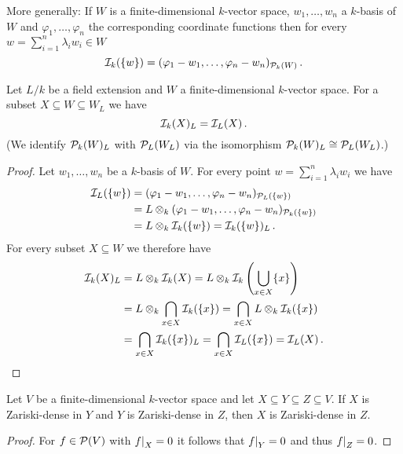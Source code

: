 More generally:
If $W$ is a finite-dimensional $k$-vector space, $w_1, \dotsc, w_n$ a $k$-basis of $W$ and $\varphi_1, \dotsc, \varphi_n$ the corresponding coordinate functions then for every $w = \sum_{i=1}^n \lambda_i w_i \in W$
\[
    \mathcal{I}_k(\{w\})
  = ( \varphi_1 - w_1, \dotsc, \varphi_n - w_n )_{\mathcal{P}_k(W)} \,.
\]


\begin{lemma}
  Let $L/k$ be a field extension and $W$ a finite-dimensional $k$-vector space.
  For a subset $X \subseteq W \subseteq W_L$ we have
  \[
      \mathcal{I}_k(X)_L
    = \mathcal{I}_L(X) \,.
  \]
  (We identify $\mathcal{P}_k(W)_L$ with $\mathcal{P}_L(W_L)$ via the isomorphism $\mathcal{P}_k(W)_L \cong \mathcal{P}_L(W_L)$.)
\end{lemma}
\begin{proof}
  Let $w_1, \dotsc, w_n$ be a $k$-basis of $W$.
  For every point $w = \sum_{i=1}^n \lambda_i w_i$ we have
  \begin{align*}
        \mathcal{I}_L(\{w\})
    &=  ( \varphi_1 - w_1, \dotsc, \varphi_n - w_n )_{ \mathcal{P}_L(\{w\}) } \\
    &=  L \otimes_k ( \varphi_1 - w_1, \dotsc, \varphi_n - w_n )_{ \mathcal{P}_k(\{w\}) } \\
    &=  L \otimes_k \mathcal{I}_k(\{w\})
     =  \mathcal{I}_k(\{w\})_L \,.
  \end{align*}
  For every subset $X \subseteq W$ we therefore have
  \begin{align*}
        \mathcal{I}_k(X)_L
    &=  L \otimes_k \mathcal{I}_k(X)
     =  L \otimes_k \mathcal{I}_k\left( \bigcup_{x \in X} \{x\} \right) \\
    &=  L \otimes_k \bigcap_{x \in X} \mathcal{I}_k(\{x\})
     =  \bigcap_{x \in X} L \otimes_k \mathcal{I}_k(\{x\}) \\
    &=  \bigcap_{x \in X} \mathcal{I}_k(\{x\})_L
     =  \bigcap_{x \in X} \mathcal{I}_L(\{x\})
     =  \mathcal{I}_L(X) \,.
    \qedhere
  \end{align*}
\end{proof}


\begin{lemma}
  Let $V$ be a finite-dimensional $k$-vector space and let $X \subseteq Y \subseteq Z \subseteq V$.
  If $X$ is Zariski-dense in $Y$ and $Y$ is Zariski-dense in $Z$, then $X$ is Zariski-dense in $Z$.
\end{lemma}


\begin{proof}
  For $f \in \mathcal{P}(V)$ with $\restrict{f}{X} = 0$ it follows that $\restrict{f}{Y} = 0$ and thus $\restrict{f}{Z} = 0$.
\end{proof}





